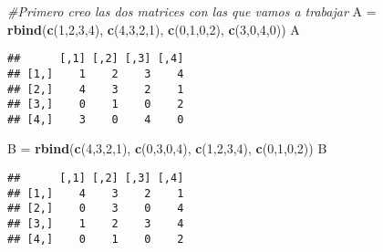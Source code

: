 \documentclass[]{article}
\newenvironment{Shaded}{\begin{snugshade}}{\end{snugshade}}
\newcommand{\KeywordTok}[1]{\textcolor[rgb]{0.13,0.29,0.53}{\textbf{#1}}}
\newcommand{\DecValTok}[1]{\textcolor[rgb]{0.00,0.00,0.81}{#1}}
\newcommand{\StringTok}[1]{\textcolor[rgb]{0.31,0.60,0.02}{#1}}
\newcommand{\CommentTok}[1]{\textcolor[rgb]{0.56,0.35,0.01}{\textit{#1}}}
\newcommand{\OperatorTok}[1]{\textcolor[rgb]{0.81,0.36,0.00}{\textbf{#1}}}
\newcommand{\NormalTok}[1]{#1}
\begin{document}
\begin{Shaded}
\begin{Highlighting}[]
\CommentTok{#Primero creo las dos matrices con las que vamos a trabajar}
\NormalTok{A =}\StringTok{ }\KeywordTok{rbind}\NormalTok{(}\KeywordTok{c}\NormalTok{(}\DecValTok{1}\NormalTok{,}\DecValTok{2}\NormalTok{,}\DecValTok{3}\NormalTok{,}\DecValTok{4}\NormalTok{), }\KeywordTok{c}\NormalTok{(}\DecValTok{4}\NormalTok{,}\DecValTok{3}\NormalTok{,}\DecValTok{2}\NormalTok{,}\DecValTok{1}\NormalTok{), }\KeywordTok{c}\NormalTok{(}\DecValTok{0}\NormalTok{,}\DecValTok{1}\NormalTok{,}\DecValTok{0}\NormalTok{,}\DecValTok{2}\NormalTok{), }\KeywordTok{c}\NormalTok{(}\DecValTok{3}\NormalTok{,}\DecValTok{0}\NormalTok{,}\DecValTok{4}\NormalTok{,}\DecValTok{0}\NormalTok{))}
\NormalTok{A}
\end{Highlighting}
\end{Shaded}

\begin{verbatim}
##      [,1] [,2] [,3] [,4]
## [1,]    1    2    3    4
## [2,]    4    3    2    1
## [3,]    0    1    0    2
## [4,]    3    0    4    0
\end{verbatim}

\begin{Shaded}
\begin{Highlighting}[]
\NormalTok{B =}\StringTok{ }\KeywordTok{rbind}\NormalTok{(}\KeywordTok{c}\NormalTok{(}\DecValTok{4}\NormalTok{,}\DecValTok{3}\NormalTok{,}\DecValTok{2}\NormalTok{,}\DecValTok{1}\NormalTok{), }\KeywordTok{c}\NormalTok{(}\DecValTok{0}\NormalTok{,}\DecValTok{3}\NormalTok{,}\DecValTok{0}\NormalTok{,}\DecValTok{4}\NormalTok{), }\KeywordTok{c}\NormalTok{(}\DecValTok{1}\NormalTok{,}\DecValTok{2}\NormalTok{,}\DecValTok{3}\NormalTok{,}\DecValTok{4}\NormalTok{), }\KeywordTok{c}\NormalTok{(}\DecValTok{0}\NormalTok{,}\DecValTok{1}\NormalTok{,}\DecValTok{0}\NormalTok{,}\DecValTok{2}\NormalTok{))}
\NormalTok{B}
\end{Highlighting}
\end{Shaded}

\begin{verbatim}
##      [,1] [,2] [,3] [,4]
## [1,]    4    3    2    1
## [2,]    0    3    0    4
## [3,]    1    2    3    4
## [4,]    0    1    0    2
\end{verbatim}

\begin{Shaded}
\end{Shaded}
\end{document}
